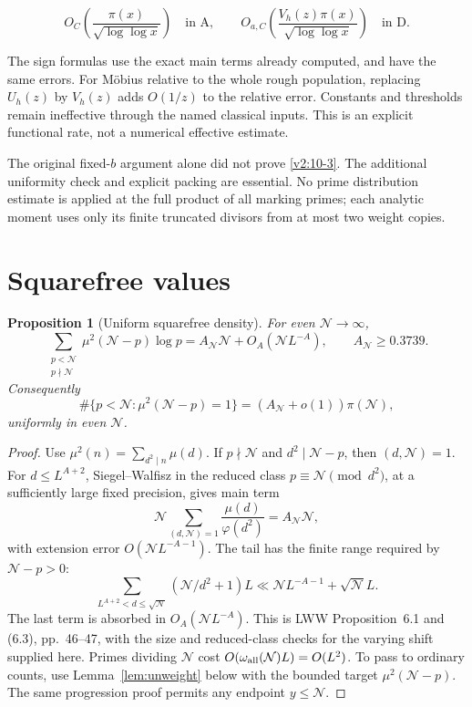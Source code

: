\documentclass[11pt]{article}
\newtheorem{proposition}[theorem]{Proposition}
\theoremstyle{definition}
\newcommand{\ph}{\varphi}
\newcommand{\GN}{\mathcal N}
\theoremstyle{remark}
\numberwithin{equation}{section}
\begin{document}
\begin{equation}\label{v2:10-3}
O_C\left(\frac{\pi(x)}{\sqrt{\log\log x}}\right)\quad\text{in A},\qquad
O_{a,C}\left(\frac{V_h(z)\pi(x)}{\sqrt{\log\log x}}\right)\quad\text{in D}.
\end{equation}


The sign formulas use the exact main terms already computed, and have the same errors. For M\"obius relative to the whole rough population, replacing $U_h(z)$ by $V_h(z)$ adds $O(1/z)$ to the relative error. Constants and thresholds remain ineffective through the named classical inputs. This is an explicit functional rate, not a numerical effective estimate.

The original fixed-$b$ argument alone did not prove \eqref{v2:10-3}. The additional uniformity check and explicit packing are essential. No prime distribution estimate is applied at the full product of all marking primes; each analytic moment uses only its finite truncated divisors from at most two weight copies.

\section{Squarefree values}\label{sec:density}
\begin{proposition}[Uniform squarefree density]\label{prop:squarefree}
For even $\GN\to\infty$,
\begin{equation}\label{eq:squarefree-weighted}
 \sum_{\substack{p<\GN\\p\nmid\GN}}\mu^2(\GN-p)\log p
 =A_{\GN}\GN+O_A(\GN L^{-A}),
 \qquad A_{\GN}\ge0.3739.
\end{equation}
Consequently
\begin{equation}\label{eq:squarefree-count}
 \#\{p<\GN:\mu^2(\GN-p)=1\}=(A_{\GN}+o(1))\pi(\GN),
\end{equation}
uniformly in even $\GN$.
\end{proposition}
\begin{proof}
Use $\mu^2(n)=\sum_{d^2\mid n}\mu(d)$.
If $p\nmid\GN$ and $d^2\mid\GN-p$, then $(d,\GN)=1$.
For $d\le L^{A+2}$, Siegel--Walfisz in the reduced class
$p\equiv\GN\pmod{d^2}$, at a sufficiently large fixed precision,
gives main term
\begin{equation}\label{eq:squarefree-series}
 \GN\sum_{(d,\GN)=1}\frac{\mu(d)}{\ph(d^2)}=A_{\GN}\GN,
\end{equation}
with extension error $O(\GN L^{-A-1})$.
The tail has the finite range required by $\GN-p>0$:
\begin{equation}\label{eq:squarefree-tail}
 \sum_{L^{A+2}<d\le\sqrt{\GN}}(\GN/d^2+1)L
 \ll\GN L^{-A-1}+\sqrt{\GN}L.
\end{equation}
The last term is absorbed in $O_A(\GN L^{-A})$.
This is LWW Proposition~6.1 and (6.3), pp.~46--47, with the size
and reduced-class checks for the varying shift supplied here.
Primes dividing $\GN$ cost $O(\omega_{\rm all}(\GN)L)=O(L^2)$.
To pass to ordinary counts, use Lemma~\ref{lem:unweight} below
with the bounded target $\mu^2(\GN-p)$.
The same progression proof permits any endpoint $y\le\GN$.
\end{proof}
\end{document}
